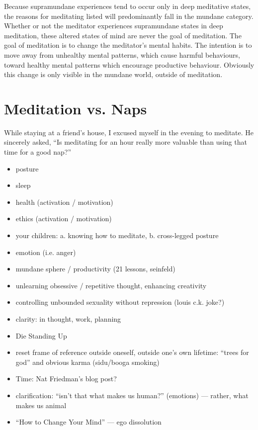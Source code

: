 \documentclass[a4paper, amsfonts, amssymb, amsmath, reprint, showkeys, nofootinbib, twoside]{revtex4-1}
\begin{document}
Because supramundane experiences tend to occur only in deep meditative states,
the reasons for meditating listed will predominantly fall in the mundane
category. Whether or not the meditator experiences supramundane states in deep
meditation, these altered states of mind are never the goal of meditation. The goal
of meditation is to change the meditator's mental habits. The intention is to move away from unhealthy
mental patterns, which cause harmful behaviours, toward healthy mental patterns which
encourage productive behaviour. Obviously this change is only visible in the mundane
world, outside of meditation.


\section{Meditation vs. Naps}

While staying at a friend's house, I excused myself in the evening to meditate. He
sincerely asked, ``Is meditating for an hour really more valuable than using that
time for a good nap?''


\begin{itemize}
  \item posture
  \item sleep
  \item health (activation / motivation)
  \item ethics (activation / motivation)
  \item your children: a. knowing how to meditate, b. cross-legged posture
  \item emotion (i.e. anger)
  \item mundane sphere / productivity (21 lessons, seinfeld)
  \item unlearning obsessive / repetitive thought, enhancing creativity
  \item controlling unbounded sexuality without repression (louis c.k. joke?)
  \item clarity: in thought, work, planning
  \item Die Standing Up
\end{itemize}

\begin{itemize}
  \item reset frame of reference outside oneself, outside one's own lifetime: ``trees
    for god'' and obvious karma (sidu/booga smoking)
  \item Time: Nat Friedman's blog post?
  \item clarification: ``isn't that what makes us human?'' (emotions) --- rather,
    what makes us animal
  \item ``How to Change Your Mind'' --- ego dissolution
\end{itemize}
\end{document}

